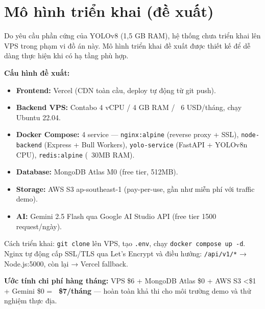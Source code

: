 \documentclass[../DoAn.tex]{subfiles}
\begin{document}
\section{Mô hình triển khai (đề xuất)}
\label{section:4.5}

Do yêu cầu phần cứng của YOLOv8 (1,5 GB RAM), hệ thống chưa triển khai lên VPS trong phạm vi đồ án này. Mô hình triển khai đề xuất được thiết kế để dễ dàng thực hiện khi có hạ tầng phù hợp.

\textbf{Cấu hình đề xuất:}
\begin{itemize}[leftmargin=*, topsep=4pt, itemsep=2pt]
  \item \textbf{Frontend:} Vercel (CDN toàn cầu, deploy tự động từ git push).
  \item \textbf{Backend VPS:} Contabo 4 vCPU / 4 GB RAM / ~6 USD/tháng, chạy Ubuntu 22.04.
  \item \textbf{Docker Compose:} 4 service — \texttt{nginx:alpine} (reverse proxy + SSL), \texttt{node-backend} (Express + Bull Workers), \texttt{yolo-service} (FastAPI + YOLOv8n CPU), \texttt{redis:alpine} (~30MB RAM).
  \item \textbf{Database:} MongoDB Atlas M0 (free tier, 512MB).
  \item \textbf{Storage:} AWS S3 ap-southeast-1 (pay-per-use, gần như miễn phí với traffic demo).
  \item \textbf{AI:} Gemini 2.5 Flash qua Google AI Studio API (free tier 1500 request/ngày).
\end{itemize}

Cách triển khai: \texttt{git clone} lên VPS, tạo \texttt{.env}, chạy \texttt{docker compose up -d}. Nginx tự động cấp SSL/TLS qua Let's Encrypt và điều hướng: \texttt{/api/v1/*} → Node.js:5000, còn lại → Vercel fallback.

\textbf{Ước tính chi phí hàng tháng:} VPS \$6 + MongoDB Atlas \$0 + AWS S3 <\$1 + Gemini \$0 = \textbf{~\$7/tháng} — hoàn toàn khả thi cho môi trường demo và thử nghiệm thực địa.
\end{document}
